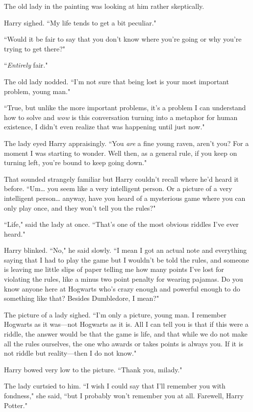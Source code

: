 The old lady in the painting was looking at him rather skeptically.

Harry sighed. ``My life tends to get a bit peculiar."

``Would it be fair to say that you don't know where you're going or why you're trying to get there?"

``\emph{Entirely} fair."

The old lady nodded. ``I'm not sure that being lost is your most important problem, young man."

``True, but unlike the more important problems, it's a problem I can understand how to solve and \emph{wow} is this conversation turning into a metaphor for human existence, I didn't even realize that was happening until just now."

The lady eyed Harry appraisingly. ``You \emph{are} a fine young raven, aren't you? For a moment I was starting to wonder. Well then, as a general rule, if you keep on turning left, you're bound to keep going down."

That sounded strangely familiar but Harry couldn't recall where he'd heard it before. ``Um{\ldots} you seem like a very intelligent person. Or a picture of a very intelligent person{\ldots} anyway, have you heard of a mysterious game where you can only play once, and they won't tell you the rules?"

``Life," said the lady at once. ``That's one of the most obvious riddles I've ever heard."

Harry blinked. ``No," he said slowly. ``I mean I got an actual note and everything saying that I had to play the game but I wouldn't be told the rules, and someone is leaving me little slips of paper telling me how many points I've lost for violating the rules, like a minus two point penalty for wearing pajamas. Do you know anyone here at Hogwarts who's crazy enough and powerful enough to do something like that? Besides Dumbledore, I mean?"

The picture of a lady sighed. ``I'm only a picture, young man. I remember Hogwarts as it was—not Hogwarts as it is. All I can tell you is that if this were a riddle, the answer would be that the game is life, and that while we do not make all the rules ourselves, the one who awards or takes points is always you. If it is not riddle but reality—then I do not know."

Harry bowed very low to the picture. ``Thank you, milady."

The lady curtsied to him. ``I wish I could say that I'll remember you with fondness," she said, ``but I probably won't remember you at all. Farewell, Harry Potter."

